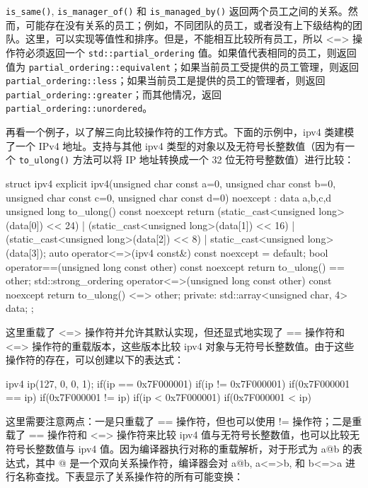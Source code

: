 \verb|is_same()|, \verb|is_manager_of()| 和 \verb|is_managed_by()| 返回两个员工之间的关系。然而，可能存在没有关系的员工；例如，不同团队的员工，或者没有上下级结构的团队。这里，可以实现等值性和排序。但是，不能相互比较所有员工，所以 <=> 操作符必须返回一个 \verb|std::partial_ordering| 值。如果值代表相同的员工，则返回值为 \verb|partial_ordering::equivalent|；如果当前员工受提供的员工管理，则返回 \verb|partial_ordering::less|；如果当前员工是提供的员工的管理者，则返回 \verb|partial_ordering::greater|；而其他情况，返回 \verb|partial_ordering::unordered|。

再看一个例子，以了解三向比较操作符的工作方式。下面的示例中，ipv4 类建模了一个 IPv4 地址。支持与其他 ipv4 类型的对象以及无符号长整数值（因为有一个 \verb|to_ulong()| 方法可以将 IP 地址转换成一个 32 位无符号整数值）进行比较：

\begin{cpp}
struct ipv4
{
    explicit ipv4(unsigned char const a=0, unsigned char const b=0,
    unsigned char const c=0, unsigned char const d=0) noexcept :
        data{ a,b,c,d }
    {}
    unsigned long to_ulong() const noexcept
    {
        return
        (static_cast<unsigned long>(data[0]) << 24) |
        (static_cast<unsigned long>(data[1]) << 16) |
        (static_cast<unsigned long>(data[2]) << 8) |
        static_cast<unsigned long>(data[3]);
    }
    auto operator<=>(ipv4 const&) const noexcept = default;
    bool operator==(unsigned long const other) const noexcept
    {
        return to_ulong() == other;
    }
    std::strong_ordering
    operator<=>(unsigned long const other) const noexcept
    {
        return to_ulong() <=> other;
    }
private:
    std::array<unsigned char, 4> data;
};
\end{cpp}

这里重载了 <=> 操作符并允许其默认实现，但还显式地实现了 == 操作符和 <=> 操作符的重载版本，这些版本比较 ipv4 对象与无符号长整数值。由于这些操作符的存在，可以创建以下的表达式：

\begin{cpp}
ipv4 ip(127, 0, 0, 1);
if(ip == 0x7F000001) {}
if(ip != 0x7F000001) {}
if(0x7F000001 == ip) {}
if(0x7F000001 != ip) {}
if(ip < 0x7F000001)  {}
if(0x7F000001 < ip)  {}
\end{cpp}

这里需要注意两点：一是只重载了 == 操作符，但也可以使用 != 操作符；二是重载了 == 操作符和 <=> 操作符来比较 ipv4 值与无符号长整数值，也可以比较无符号长整数值与 ipv4 值。因为编译器执行对称的重载解析，对于形式为 a@b 的表达式，其中 @ 是一个双向关系操作符，编译器会对 a@b, a<=>b, 和 b<=>a 进行名称查找。下表显示了关系操作符的所有可能变换：


